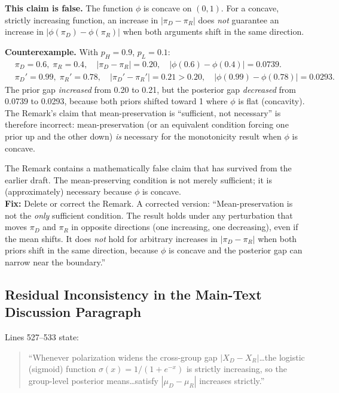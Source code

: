 \documentclass[11pt]{article}
\begin{document}
\textbf{This claim is false.} The function $\phi$ is concave on $(0,1)$. For a concave, strictly increasing function, an increase in $|\pi_D - \pi_R|$ does \emph{not} guarantee an increase in $|\phi(\pi_D) - \phi(\pi_R)|$ when both arguments shift in the same direction.

\textbf{Counterexample.} With $p_H = 0.9$, $p_L = 0.1$:
\begin{align*}
    &\pi_D = 0.6,\; \pi_R = 0.4,\quad |\pi_D - \pi_R| = 0.20, \quad |\phi(0.6) - \phi(0.4)| = 0.0739. \\
    &\pi_D' = 0.99,\; \pi_R' = 0.78,\quad |\pi_D' - \pi_R'| = 0.21 > 0.20, \quad |\phi(0.99) - \phi(0.78)| = 0.0293.
\end{align*}
The prior gap \emph{increased} from 0.20 to 0.21, but the posterior gap \emph{decreased} from 0.0739 to 0.0293, because both priors shifted toward 1 where $\phi$ is flat (concavity). The Remark's claim that mean-preservation is ``sufficient, not necessary'' is therefore incorrect: mean-preservation (or an equivalent condition forcing one prior up and the other down) \emph{is} necessary for the monotonicity result when $\phi$ is concave.

\begin{criticalbox}
The Remark contains a mathematically false claim that has survived from the earlier draft. The mean-preserving condition is not merely sufficient; it is (approximately) necessary because $\phi$ is concave.\\[4pt]
\textbf{Fix:} Delete or correct the Remark. A corrected version: ``Mean-preservation is not the \emph{only} sufficient condition. The result holds under any perturbation that moves $\pi_D$ and $\pi_R$ in opposite directions (one increasing, one decreasing), even if the mean shifts. It does \emph{not} hold for arbitrary increases in $|\pi_D - \pi_R|$ when both priors shift in the same direction, because $\phi$ is concave and the posterior gap can narrow near the boundary.''
\end{criticalbox}

\subsection{Residual Inconsistency in the Main-Text Discussion Paragraph}

Lines 527--533 state:

\begin{quote}
``Whenever polarization widens the cross-group gap $|X_D - X_R|$\ldots the logistic (sigmoid) function $\sigma(x) = 1/(1+e^{-x})$ is strictly increasing, so the group-level posterior means\ldots satisfy $|\mu_D - \mu_R|$ increases strictly.''
\end{quote}
\end{document}
